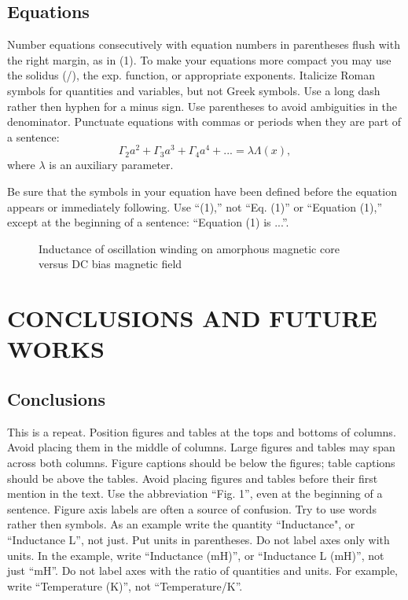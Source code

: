 \documentclass[letterpaper, 10 pt, conference]{ieeeconf}  %
\begin{document}
\subsection{Equations}

Number equations consecutively with equation numbers in parentheses flush
 with the right margin, as in (1). To make your equations more compact
 you may use the solidus (/), the exp. function, or appropriate exponents.
  Italicize Roman symbols for quantities and variables, but not Greek symbols.
   Use a long dash rather then hyphen for a minus sign. Use parentheses to avoid
    ambiguities in the denominator.
Punctuate equations with commas or periods when they are part of a sentence:
$$\Gamma_2 a^2 + \Gamma_3 a^3 + \Gamma_4 a^4 + ... = \lambda \Lambda(x),$$
where $\lambda$ is an auxiliary parameter.

Be sure that the symbols in your equation have been defined before the
equation appears or immediately following.
Use ``(1),'' not ``Eq. (1)'' or ``Equation (1),''
except at the beginning of a sentence: ``Equation (1) is ...''.

   \begin{figure}[thpb]
      \centering
      \caption{Inductance of oscillation winding on amorphous
       magnetic core versus DC bias magnetic field}
      \label{figurelabel}
   \end{figure}

\section{CONCLUSIONS AND FUTURE WORKS}

\subsection{Conclusions}

This is a repeat.
Position figures and tables at the tops and bottoms of columns.
Avoid placing them in the middle of columns. Large figures and tables
may span across both columns. Figure captions should be below the figures;
 table captions should be above the tables. Avoid placing figures and tables
  before their first mention in the text. Use the abbreviation ``Fig. 1'',
  even at the beginning of a sentence.
Figure axis labels are often a source of confusion.
Try to use words rather then symbols. As an example write the quantity ``Inductance",
 or ``Inductance L'', not just.
 Put units in parentheses. Do not label axes only with units.
 In the example, write ``Inductance (mH)'', or ``Inductance L (mH)'', not just ``mH''.
 Do not label axes with the ratio of quantities and units.
 For example, write ``Temperature (K)'', not ``Temperature/K''.
\end{document}
